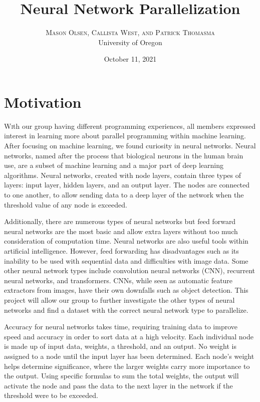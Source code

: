 \documentclass[twoside,twocolumn]{article}
\title{Neural Network Parallelization} %
\author{%
\textsc{Mason Olsen, Callista West, and Patrick Thomasma} \\[1ex] %
\normalsize University of Oregon \\ %
}
\date{October 11, 2021} %
\begin{document}
\maketitle


\section{Motivation}

\lettrine[nindent=0em,lines=3]{W}
ith our group having different programming experiences, all members expressed interest in learning more about parallel programming within machine learning. After focusing on machine learning, we found curiosity in neural networks. Neural networks, named after the process that biological neurons in the human brain use, are a subset of machine learning and a major part of deep learning algorithms. Neural networks, created with node layers, contain three types of layers: input layer, hidden layers, and an output layer. The nodes are connected to one another, to allow sending data to a deep layer of the network when the threshold value of any node is exceeded. 

Additionally, there are numerous types of neural networks but feed forward neural networks are the most basic and allow extra layers without too much consideration of computation time.  Neural networks are also useful tools within artificial intelligence. However, feed forwarding has disadvantages such as its inability to be used with sequential data and difficulties with image data. Some other neural network types include convolution neural networks (CNN), recurrent neural networks, and transformers. CNNs, while seen as automatic feature extractors from images, have their own downfalls such as object detection. This project will allow our group to further investigate the other types of neural networks and find a dataset with the correct neural network type to parallelize.

Accuracy for neural networks takes time, requiring training data to improve speed and accuracy in order to sort data at a high velocity. Each individual node is made up of input data, weights, a threshold, and an output. No weight is assigned to a node until the input layer has been determined. Each node’s weight helps determine significance, where the larger weights carry more importance to the output. Using specific formulas to sum the total weights, the output will activate the node and pass the data to the next layer in the network if the threshold were to be exceeded.
\end{document}
